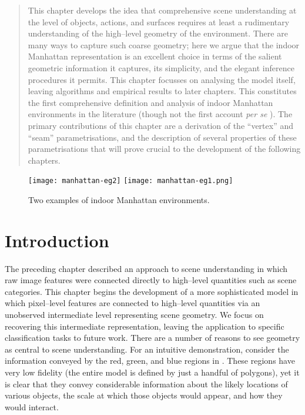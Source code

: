 \begin{quote}
  This chapter develops the idea that comprehensive scene
  understanding at the level of objects, actions, and surfaces
  requires at least a rudimentary understanding of the high--level
  geometry of the environment. There are many ways to capture such
  coarse geometry; here we argue that the indoor Manhattan
  representation is an excellent choice in terms of the salient
  geometric information it captures, its simplicity, and the elegant
  inference procedures it permits. This chapter focusses on analysing
  the model itself, leaving algorithms and empirical results to later
  chapters. This constitutes the first comprehensive definition and
  analysis of indoor Manhattan environments in the literature (though
  not the first account \textit{per se} \cite{Lee09}). The primary
  contributions of this chapter are a derivation of the ``vertex'' and
  ``seam'' parametrisations, and the description of several properties
  of these parametrisations that will prove crucial to the development
  of the following chapters.\footnotemark
\end{quote}


\begin{figure}[tb]%
  \centering
    \texttt{[image: manhattan-eg2]}
    \texttt{[image: manhattan-eg1.png]}
    \caption{Two examples of indoor Manhattan environments.}
  \label{fig:geometry-egs}
\end{figure}

\section{Introduction}

The preceding chapter described an approach to scene understanding in
which raw image features were connected directly to high--level
quantities such as scene categories. This chapter begins the
development of a more sophisticated model in which pixel--level
features are connected to high--level quantities via an unobserved
intermediate level representing scene geometry. We focus on recovering
this intermediate representation, leaving the application to specific
classification tasks to future work. There are a number of reasons to
see geometry as central to scene understanding. For an intuitive
demonstration, consider the information conveyed by the red, green,
and blue regions in . These regions have very low
fidelity (the entire model is defined by just a handful of polygons),
yet it is clear that they convey considerable information about the
likely locations of various objects, the scale at which those objects
would appear, and how they would interact.

